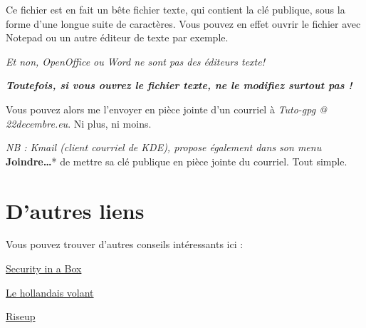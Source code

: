 Ce fichier est en fait un bête fichier texte, qui contient la clé
publique, sous la forme d'une longue suite de caractères. Vous pouvez en
effet ouvrir le fichier avec Notepad ou un autre éditeur de texte par
exemple.

\emph{Et non, OpenOffice ou Word ne sont pas des éditeurs texte!}

\textbf{\emph{Toutefois, si vous ouvrez le fichier texte, ne le modifiez
surtout pas !}}

Vous pouvez alors me l'envoyer en pièce jointe d'un courriel à
\emph{Tuto-gpg @ 22decembre.eu}. Ni plus, ni moins.

\emph{NB : Kmail (client courriel de KDE), propose également dans son menu }\textbf{Joindre\ldots{}}* de mettre sa clé publique en pièce
jointe du courriel. Tout simple.

\section{D'autres liens}\label{dautres-liens}

Vous pouvez trouver d'autres conseils intéressants ici :

\href{https://securityinabox.org/fr/thunderbird_utiliserenigmail}{Security
in a Box}

\href{http://lehollandaisvolant.net/tuto/gpg/}{Le hollandais volant}

\href{https://help.riseup.net/fr/security/message-security/openpgp/gpg-best-practices}{Riseup}

